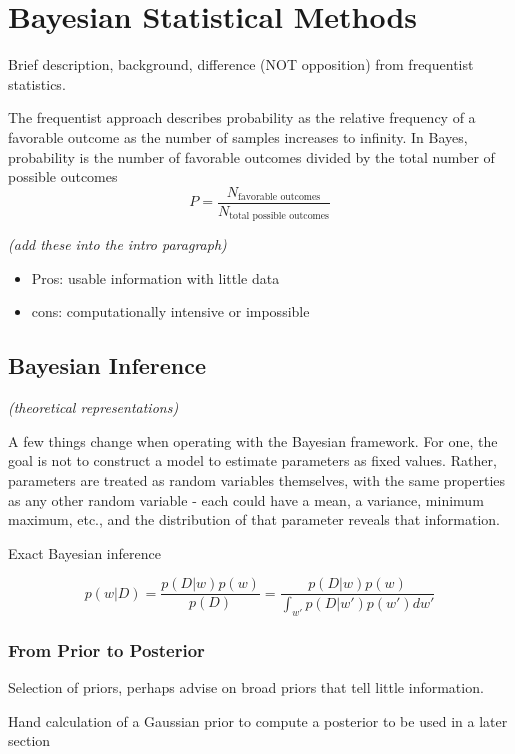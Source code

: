\chapter{Bayesian Statistical Methods}

Brief description, background, difference (NOT opposition) from frequentist statistics.

The frequentist approach describes probability as the relative frequency of a favorable outcome as the number of samples increases to infinity.  In Bayes, probability is the number of favorable outcomes divided by the total number of possible outcomes \cite{gelmanbayesian3}
$$
P = \frac{N_{\text{favorable outcomes}}}{N_{\text{total possible outcomes}}}
$$

\textit{(add these into the intro paragraph)}
\begin{itemize}
\tightlist
\item
Pros: usable information with little data
\item
cons: computationally intensive or impossible
\end{itemize}


\section{Bayesian Inference} %

\textit{(theoretical representations)}

A few things change when operating with the Bayesian framework.  For one, the goal is not to construct a model to estimate parameters as fixed values.  Rather, parameters are treated as random variables themselves, with the same properties as any other random variable - each could have a mean, a variance, minimum maximum, etc., and the distribution of that parameter reveals that information.

Exact Bayesian inference

$$
p(w|D) = \frac{p(D|w)p(w)}{p(D)} = \frac{p(D|w)p(w)}{\int_{w'} p(D|w')p(w')dw'}
$$




\subsection{From Prior to Posterior}

Selection of priors, perhaps advise on broad priors that tell little information.

Hand calculation of a Gaussian prior to compute a posterior to be used in a later section

